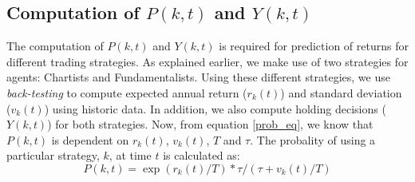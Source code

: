 \subsection{Computation of $P(k,t)$ and $Y(k,t)$}
The computation of $P(k,t)$ and $Y(k,t)$ is required for prediction of returns for different trading strategies. As explained earlier, we make use of two strategies for agents: Chartists and Fundamentalists. Using these different strategies, we use \textit{back-testing} to compute expected annual return ($r_k(t)$) and standard deviation ($v_k(t)$) using historic data. In addition, we also compute holding decisions ($Y(k,t)$) for both strategies. Now, from equation \ref{prob_eq}, we know that $P(k,t)$ is dependent on $r_k(t)$, $v_k(t)$, $T$ and $\tau$. The probality of using a particular strategy, $k$, at time $t$ is calculated as:
\begin{equation} \label{prob_comp}
P(k,t) = \exp(r_k(t) / T) * \tau / (\tau + v_k(t) / T) 
\end{equation}
